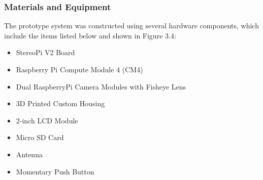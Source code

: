 \subsubsection{Materials and Equipment}


The prototype system was constructed using several hardware components, which include the items listed below and shown in Figure 3.4:
\begin{itemize}
	\item StereoPi V2 Board
	\item Raspberry Pi Compute Module 4 (CM4)
	\item Dual RaspberryPi Camera Modules with Fisheye Lens
	\item 3D Printed Custom Housing
	\item 2-inch LCD Module
	\item Micro SD Card
	\item Antenna
	\item Momentary Push Button
\end{itemize}

